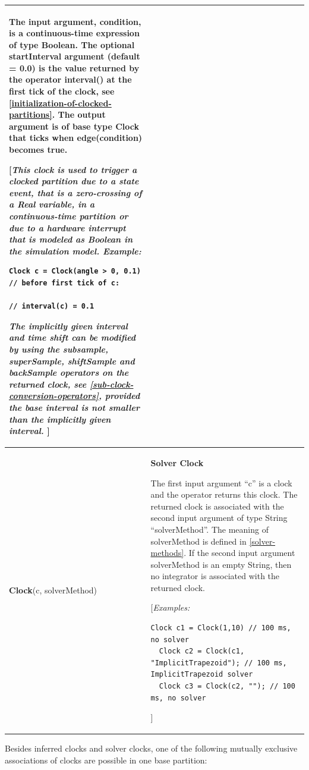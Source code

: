 \documentclass[10pt,a4paper]{report}
\begin{document}
\begin{longtable}[]{|p{2cm}|p{12cm}|}
The input argument, condition, is a continuous-time expression of type
Boolean. The optional startInterval argument (default = 0.0) is the
value returned by the operator \textbf{interval}() at the first tick of
the clock, see \ref{initialization-of-clocked-partitions}. The output argument is of base type Clock
that ticks when \textbf{edge}(condition) becomes true.

{[}\emph{This clock is used to trigger a clocked partition due to a
state event, that is a zero-crossing of a Real variable, in a
continuous-time partition or due to a hardware interrupt that is modeled
as Boolean in the simulation model. Example:}

\begin{lstlisting}[language=modelica]
  Clock c = Clock(angle > 0, 0.1) // before first tick of c:
                                                     // interval(c) = 0.1
\end{lstlisting}

\emph{The implicitly given interval and time shift can be modified by
using the subsample, superSample, shiftSample and backSample operators
on the returned clock, see \ref{sub-clock-conversion-operators}, provided the base
interval is not smaller than the implicitly given interval.} {]}
\\ \hline
\textbf{Clock}(c,
solverMethod)
&
\textbf{Solver Clock}

The first input argument ``c'' is a clock and the operator returns this
clock. The returned clock is associated with the second input argument
of type String ``solverMethod''. The meaning of solverMethod is defined
in \ref{solver-methods}. If the second input argument solverMethod is an empty
String, then no integrator is associated with the returned clock.

{[}\emph{Examples:}
\begin{lstlisting}[language=modelica]
  Clock c1 = Clock(1,10) // 100 ms, no solver
  Clock c2 = Clock(c1, "ImplicitTrapezoid"); // 100 ms, ImplicitTrapezoid solver 
  Clock c3 = Clock(c2, ""); // 100 ms, no solver
\end{lstlisting}
{]}\strut
\\ \hline

\end{longtable}

Besides inferred clocks and solver clocks, one of the following mutually
exclusive associations of clocks are possible in one base partition:
\end{document}
